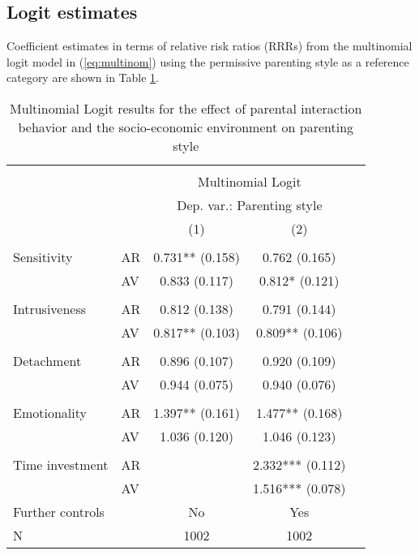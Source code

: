 \subsection{Logit estimates}
Coefficient estimates in terms of relative risk ratios (RRRs) from the multinomial logit model in (\ref{eq:multinom}) using the permissive parenting style as a reference category are shown in Table \ref{tab:res}.  
%
\begin{table}[!htbp]
	\centering
	\begin{threeparttable}
		\caption{Multinomial Logit results for the effect of parental interaction behavior and the socio-economic environment on parenting style}
		\label{tab:res}
		\begin{tabular}[t]{llccc}
			\hline \hline \\[-1.8ex]
			&    &  \multicolumn{2}{c}{Multinomial Logit}\\
			&    &  \multicolumn{2}{c}{Dep. var.: Parenting style}\\
			&    & (1) & (2) \\
			\cline{3-4} \\[-1.8ex]
			Sensitivity & AR & 0.731** (0.158) & 0.762 (0.165)\\
			& AV & 0.833 (0.117) & 0.812* (0.121)\\
			&  &  \vphantom{4} & \\
			Intrusiveness & AR & 0.812 (0.138) & 0.791 (0.144)\\
			& AV & 0.817** (0.103) & 0.809** (0.106)\\
			&  &  \vphantom{3} & \\
			Detachment & AR & 0.896 (0.107) & 0.920 (0.109)\\
			& AV & 0.944 (0.075) & 0.940 (0.076)\\
			&  &  \vphantom{2} & \\
			Emotionality & AR & 1.397** (0.161) & 1.477** (0.168)\\
			& AV & 1.036 (0.120) & 1.046 (0.123)\\
			&  &  \vphantom{1} & \\
			Time investment & AR &  & 2.332*** (0.112)\\
			& AV &  & 1.516*** (0.078)\\
			\midrule
			Further controls &  & No & Yes\\
			N &  & 1002 & 1002\\

\end{tabular}
\end{threeparttable}
\end{table}
